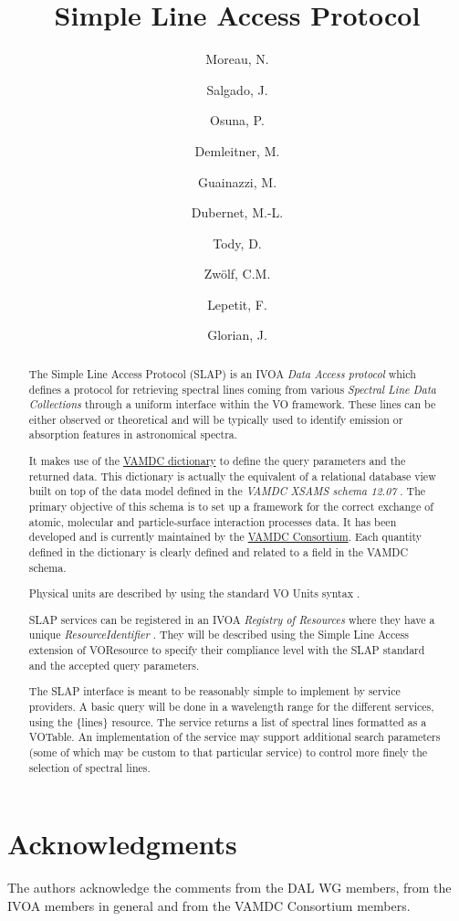 \documentclass[11pt,a4paper]{ivoa}
\title{Simple Line Access Protocol}
\author{Moreau, N.}
\author{Salgado, J.}
\author{Osuna, P.}
\author{Demleitner, M.}
\author{Guainazzi, M.}
\author{Dubernet, M.-L.}
\author{Tody, D.}
\author{Zwölf, C.M.}
\author{Lepetit, F.}
\author{Glorian, J.}
\begin{document}
\begin{abstract}
The Simple Line Access Protocol (SLAP) is an IVOA
\textit{{Data Access protocol}} which defines a protocol for retrieving
spectral lines coming from various \textit{{Spectral Line Data
Collections}}  through a uniform interface within the VO framework.
These lines can be either observed or theoretical and will be typically
used to identify emission or absorption features in astronomical
spectra.

It makes use of the \href{https://dictionary.vamdc.eu/}{VAMDC dictionary} to define the query parameters and the returned data.
This dictionary is actually the equivalent of a relational database view built on top of the data model defined in
the \textit{VAMDC XSAMS schema 12.07}
\citep{std:XSAMS12.07}. The primary objective of this schema is to set up a framework for the correct exchange
of atomic, molecular and particle-surface interaction processes data.
It has been developed and is currently maintained by the \href{https://vamdc.org/structure/presentation/}{VAMDC Consortium}.
Each quantity defined in the dictionary is clearly defined and related to a field in the VAMDC schema.

Physical units are described by using the standard VO Units syntax \citep{2014ivoa.spec.0523D}.

SLAP services can be registered in an IVOA \textit{Registry of Resources}
where they have a unique \textit{ResourceIdentifier}
\citep{2016ivoa.spec.0523D}.
They will be described using the Simple Line Access extension
\citep{2017ivoa.spec.0530P} of VOResource to specify their
compliance level with the SLAP standard and the accepted query
parameters.

The SLAP interface is meant to be reasonably simple to implement by
service providers. A basic query will be done in a wavelength range for
the different services, using the \{lines\} resource. The service
returns a list of spectral lines formatted as a VOTable.  An
implementation of the service may support additional search parameters
(some of which may be custom to that particular service) to control more finely the selection of spectral lines.
\end{abstract}

\section*{Acknowledgments}

The authors acknowledge the comments from the DAL WG members, from the
IVOA members in general and from the VAMDC Consortium members.
\end{document}
